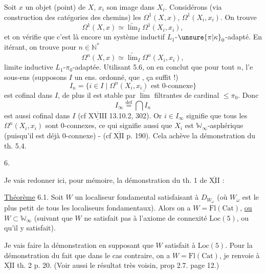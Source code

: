 Soit $x$ un objet (point) de $X$, $x_i$ son image dans $X_i$. Considérons (via  construction  des catégories des chemins)  les $\Omega^1(X,x)$, $\Omega^1(X_i,x_i)$. On trouve
\[
\Omega^1(X,x)\simeq\underrightarrow{\lim}_{I}\Omega^1(X_i,x_i),
\]
et on vérifie que c'est là encore un système inductif $L_1$-$\unsure{\pi|\kappa}_0$-adapté. En itérant, on trouve pour $n\in\mathbb N^*$
\[
\Omega^n(X,x)\simeq\underrightarrow{\lim}_{I}\Omega^n(X_i,x_i),
\]
limite inductive $L_1$-$\pi_0$-adaptée. Utilisant 5.6, on en conclut que pour
tout $n$, l'e sous-ens (supposons $I$ un ens. ordonné, que  , ça suffit !)
\[
I_n=\{i\in I\mid \Omega^n(X_i,x_i)\text{ est }0\text{-connexe}\}
\]
est cofinal dans $I$, de plus il est stable par $\underrightarrow{\lim}$ filtrantes de cardinal $\leq\pi_0$.
Donc
\[
I_\infty\overset{\mathrm{def}}{=}\bigcap I_n
\]
est aussi cofinal dans $I$ (cf $\overline{\underline{\mathrm{XVIII}}}$ 13.10.2,  302).
Or $i\in I_\infty$ signifie que tous les $\Omega^n(X_i,x_i)$ sont $0$-connexes, ce qui signifie aussi que $X_i$ est $\mathbb W_\infty$-asphérique (puisqu'il est déjà $0$-connexe) - (cf $\overline{\underline{\mathrm{XII}}}$  p. 190). Cela achève la démonstration du th. 5.4.

6. \uline{} 

Je vais redonner ici, pour mémoire, la démonstration du th. 1 de $\overline{\underline{\mathrm{XII}}}$ :

\uline{Théorème} 6.1. Soit $W$ un localiseur fondamental satisfaisant à $D_{W_\omega}$ (où $W_\omega$ est le plus petit de tous les localiseurs fondamentaux). Alors on a $W=\mathrm{Fl}(\mathrm{Cat})$, \uline{ou} $W\subset\mathbb W_\infty$ (suivant que $W$ ne satisfait pas à l'axiome de connexité $\mathrm{Loc}(5)$, ou qu'il y satisfait).

Je vais faire la démonstration en supposant que $W$ satisfait à $\mathrm{Loc}(5)$. Pour la démonstration du fait que dans le cas contraire, on a $W=\mathrm{Fl}(\mathrm{Cat})$, je renvoie à $\overline{\underline{\mathrm{XII}}}$ th. 2 p. 20. (Voir aussi le résultat  très voisin,   prop 2.7. page 12.)

